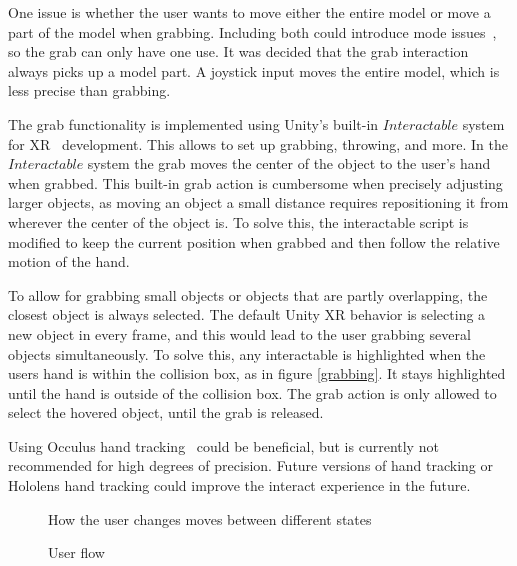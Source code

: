 \documentclass[a4paper]{report}
\begin{document}
One issue is whether the user wants to move either the entire model or move a part of the model when grabbing. Including both could introduce mode issues~\cite{experience_modes_nodate}, so the grab can only have one use.
It was decided that the grab interaction always picks up a model part. A joystick input moves the entire model, which is less precise than grabbing.

The grab functionality is implemented using Unity's built-in $Interactable$ system for XR~\cite{noauthor_xr_nodate} development. This allows to set up grabbing, throwing, and more.
In the $Interactable$ system the grab moves the center of the object to the user's hand when grabbed. This built-in grab action is cumbersome when precisely adjusting larger objects, as moving an object a small distance requires repositioning it from wherever the center of the object is.
To solve this, the interactable script is modified to keep the current position when grabbed and then follow the relative motion of the hand.

To allow for grabbing small objects or objects that are partly overlapping, the closest object is always selected.
The default Unity XR behavior is selecting a new object in every frame, and this would lead to the user grabbing several objects simultaneously. To solve this, any interactable is highlighted when the users hand is within the collision box, as in figure \ref{grabbing}. It stays highlighted until the hand is outside of the collision box. The grab action is only allowed to select the hovered object, until the grab is released.

Using Occulus hand tracking~\cite{noauthor_set_nodate} could be beneficial, but is currently not recommended for high degrees of precision. Future versions of hand tracking or Hololens hand tracking could improve the interact experience in the future.


\begin{figure}[h!]
    \centering
	\hfill
	\caption{User flow}\label{flow}
  \small
  How the user changes moves between different states
\end{figure}
\end{document}
